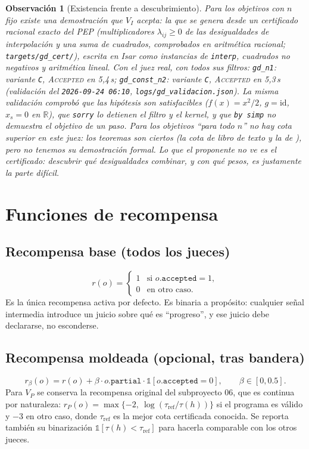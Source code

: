 \documentclass[11pt,a4paper]{article}
\newtheorem{remark}{Observación}
\begin{document}
\begin{remark}[Existencia frente a descubrimiento]
Para los objetivos con $n$ fijo existe una demostración que $V_I$ acepta: la que se genera desde un certificado racional exacto del PEP (multiplicadores $\lambda_{ij} \ge 0$ de las desigualdades de interpolación y una suma de cuadrados, comprobados en aritmética racional; \texttt{targets/gd\_cert/}), escrita en Isar como instancias de \texttt{interp}, cuadrados no negativos y aritmética lineal. Con el juez real, con todos sus filtros: \texttt{gd\_\allowbreak{}n1}: variante \texttt{C}, \textsc{Accepted} en 5{,}4\,s; \texttt{gd\_\allowbreak{}const\_\allowbreak{}n2}: variante \texttt{C}, \textsc{Accepted} en 5{,}3\,s (validación del \texttt{2026-\allowbreak{}09-\allowbreak{}24 06:\allowbreak{}10}, \texttt{logs/gd\_validacion.json}). La misma validación comprobó que las hipótesis son satisfacibles ($f(x) = x^2/2$, $g = \mathrm{id}$, $x_s = 0$ en $\mathbb{R}$), que \texttt{sorry} lo detienen el filtro y el kernel, y que \texttt{by simp} no demuestra el objetivo de un paso. Para los objetivos ``para todo $n$'' no hay cota superior en este juez: los teoremas son ciertos (la cota de libro de texto y la de \citet{DroriTeboulle2014}), pero no tenemos su demostración formal. Lo que el proponente no ve es el certificado: descubrir qué desigualdades combinar, y con qué pesos, es justamente la parte difícil.
\end{remark}

\section{Funciones de recompensa}

\subsection{Recompensa base (todos los jueces)}
\[
  r(o) = \begin{cases} 1 & \text{si } o.\texttt{accepted} = 1,\\ 0 & \text{en otro caso.}\end{cases}
\]
Es la única recompensa activa por defecto. Es binaria a propósito: cualquier señal intermedia introduce un juicio sobre qué es ``progreso'', y ese juicio debe declararse, no esconderse.

\subsection{Recompensa moldeada (opcional, tras bandera)}
\[
  r_\beta(o) = r(o) + \beta \cdot o.\texttt{partial} \cdot \mathbb{1}[o.\texttt{accepted}=0],\qquad \beta \in [0, 0.5].
\]
Para $V_P$ se conserva la recompensa original del subproyecto 06, que es continua por naturaleza: $r_P(o) = \max\{-2,\ \log(\tau_{\mathrm{ref}}/\tau(h))\}$ si el programa es válido y $-3$ en otro caso, donde $\tau_{\mathrm{ref}}$ es la mejor cota certificada conocida. Se reporta también su binarización $\mathbb{1}[\tau(h) < \tau_{\mathrm{ref}}]$ para hacerla comparable con los otros jueces.
\end{document}
